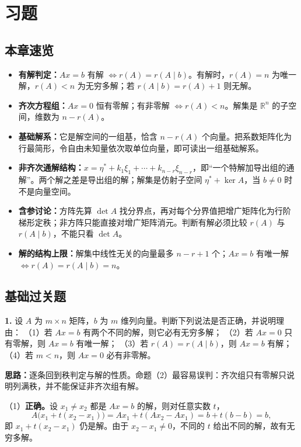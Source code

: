 \section{习题}

\subsection{本章速览}

\begin{itemize}
\item \textbf{有解判定：}$Ax=b$ 有解 $\iff r(A)=r(A\mid b)$。有解时，$r(A)=n$ 为唯一解，$r(A)<n$ 为无穷多解；若 $r(A\mid b)=r(A)+1$ 则无解。
\item \textbf{齐次方程组：}$Ax=0$ 恒有零解；有非零解 $\iff r(A)<n$。解集是 $\mathbb R^n$ 的子空间，维数为 $n-r(A)$。
\item \textbf{基础解系：}它是解空间的一组基，恰含 $n-r(A)$ 个向量。把系数矩阵化为行最简形，令自由未知量依次取单位向量，即可读出一组基础解系。
\item \textbf{非齐次通解结构：}$x=\eta^*+k_1\xi_1+\cdots+k_{n-r}\xi_{n-r}$，即“一个特解加导出组的通解”。两个解之差是导出组的解；解集是仿射子空间 $\eta^*+\ker A$，当 $b\neq0$ 时不是向量空间。
\item \textbf{含参讨论：}方阵先算 $\det A$ 找分界点，再对每个分界值把增广矩阵化为行阶梯形定秩；非方阵只能直接对增广矩阵消元。判断有解必须比较 $r(A)$ 与 $r(A\mid b)$，不能只看 $\det A$。
\item \textbf{解的结构上限：}解集中线性无关的向量最多 $n-r+1$ 个；$Ax=b$ 有唯一解 $\iff r(A)=r(A\mid b)=n$。
\end{itemize}

\subsection{基础过关题}

\textbf{1.} 设 $A$ 为 $m\times n$ 矩阵，$b$ 为 $m$ 维列向量。判断下列说法是否正确，并说明理由：
（1）若 $Ax=b$ 有两个不同的解，则它必有无穷多解；
（2）若 $Ax=0$ 只有零解，则 $Ax=b$ 有唯一解；
（3）若 $r(A)=r(A\mid b)$，则 $Ax=b$ 有解；
（4）若 $m<n$，则 $Ax=0$ 必有非零解。

\ifshowsolutions%

\textbf{思路：}逐条回到秩判定与解的性质。命题（2）最容易误判：齐次组只有零解只说明列满秩，并不能保证非齐次组有解。

（1）\textbf{正确。}设 $x_1\neq x_2$ 都是 $Ax=b$ 的解，则对任意实数 $t$，
\[
A\bigl(x_1+t(x_2-x_1)\bigr)=Ax_1+t(Ax_2-Ax_1)=b+t(b-b)=b,
\]
即 $x_1+t(x_2-x_1)$ 仍是解。由于 $x_2-x_1\neq0$，不同的 $t$ 给出不同的解，故有无穷多解。

